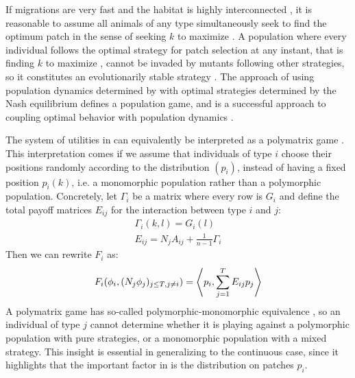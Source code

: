 If migrations are very fast and the habitat is highly interconnected \citep{abrams2007role, cressman2006migration}, it is reasonable to assume all animals of any type simultaneously seek to find the optimum patch in the sense of seeking $k$ to maximize . A population where every individual follows the optimal strategy for patch selection at any instant, that is finding $k$ to maximize , cannot be invaded by mutants following other strategies, so it constitutes an evolutionarily stable strategy \citep{kvrivan2009evolutionary}. The approach of using population dynamics determined by  with optimal strategies determined by the Nash equilibrium defines a population game, and is a successful approach to coupling optimal behavior with population dynamics \citep{valdovinos2010consequences, mougi2019adaptive, pinti2021co}.


The system of utilities in  can equivalently be interpreted as a polymatrix game \citep{howson1972equilibria}. This interpretation comes if we assume that individuals of type $i$ choose their positions randomly according to the distribution $(p_i)$, instead of having a fixed position $p_i(k)$, i.e. a monomorphic population rather than a polymorphic population. Concretely, let $\Gamma_i$ be a matrix where every row is $G_i$ and define the total payoff matrices $E_{ij}$ for the interaction between type $i$ and $j$:
\begin{equation}
  \label{eq:disc_tot_payoff}
  \begin{split}
  \Gamma_i(k,l) = G_i(l) \\
    E_{ij} = N_j A_{ij} + \frac{1}{n-1}\Gamma_i
  \end{split}
\end{equation}
Then we can rewrite $F_i$ as:
\begin{equation}
  F_i(\phi_i, (N_j \phi_j)_{j \leq T, j \neq i}) = \ip{p_i}{\sum_{j=1}^T E_{ij} p_j}
\end{equation}
A polymatrix game has so-called polymorphic-monomorphic equivalence \citep{broom2013game}, so an individual of type $j$ cannot determine whether it is playing against a polymorphic population with pure strategies, or a monomorphic population with a mixed strategy. This insight is essential in generalizing to the continuous case, since it highlights that the important factor in  is the distribution on patches $p_i$.

